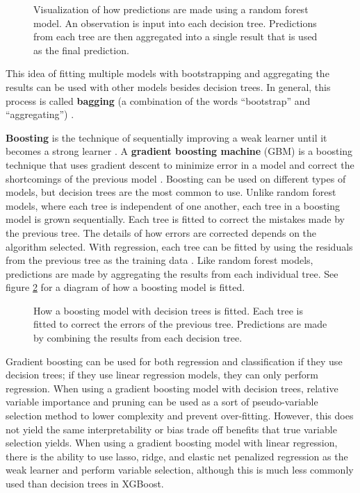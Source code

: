 \documentclass{article}
\begin{document}
\begin{figure}[b!]
	\footnotesize
	\centering
	
	\captionsetup{width = 0.8\textwidth}
	\caption{Visualization of how predictions are made using a random forest model. An observation is input into each decision tree. Predictions from each tree are then aggregated into a single result that is used as the final prediction.}
	\label{fig:random-forest}
\end{figure}

This idea of fitting multiple models with bootstrapping and aggregating the results can be used with other models besides decision trees. In general, this process is called \textbf{bagging} (a combination of the words ``bootstrap'' and ``aggregating'') \cite{breiman1996bagging}. 

\textbf{Boosting} is the technique of sequentially improving a weak learner until it becomes a strong learner \cite{schapire1990strength}. A \textbf{gradient boosting machine} (GBM) is a boosting technique that uses gradient descent to minimize error in a model and correct the shortcomings of the previous model \cite{friedman2001greedy}. Boosting can be used on different types of models, but decision trees are the most common to use. Unlike random forest models, where each tree is independent of one another, each tree in a boosting model is grown sequentially. Each tree is fitted to correct the mistakes made by the previous tree. The details of how errors are corrected depends on the algorithm selected. With regression, each tree can be fitted by using the residuals from the previous tree as the training data \cite{james2013introduction}. Like random forest models, predictions are made by aggregating the results from each individual tree. See figure \ref{fig:boosting} for a diagram of how a boosting model is fitted.

\begin{figure}[t!]
	\footnotesize
	\centering
	
	\captionsetup{width = 0.8\textwidth}
	\caption{How a boosting model with decision trees is fitted. Each tree is fitted to correct the errors of the previous tree. Predictions are made by combining the results from each decision tree.}
	\label{fig:boosting}
\end{figure}

Gradient boosting can be used for both regression and classification if they use decision trees; if they use linear regression models, they can only perform regression. When using a gradient boosting model with decision trees, relative variable importance and pruning can be used as a sort of pseudo-variable selection method to lower complexity and prevent over-fitting. However, this does not yield the same interpretability or bias trade off benefits that true variable selection yields. When using a gradient boosting model with linear regression, there is the ability to use lasso, ridge, and elastic net penalized regression as the weak learner and perform variable selection, although this is much less commonly used than decision trees in XGBoost.
\end{document}
